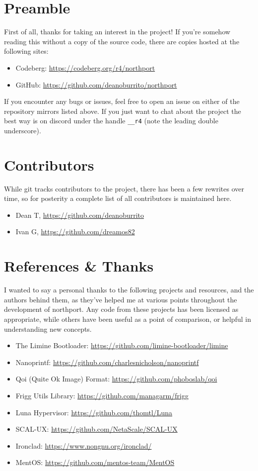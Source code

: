 \section{Preamble}
First of all, thanks for taking an interest in the project! If you're somehow reading this without a copy of the source code, there are copies hosted at the following sites:

\begin{itemize}
    \item Codeberg: \url{https://codeberg.org/r4/northport}
    \item GitHub: \url{https://github.com/deanoburrito/northport}
\end{itemize}

If you encounter any bugs or issues, feel free to open an issue on either of the repository mirrors listed above. If you just want to chat about the project the best way is on discord under the handle \verb|__r4| (note the leading double underscore).

\section{Contributors}
While git tracks contributors to the project, there has been a few rewrites over time, so for posterity a complete list of all contributors is maintained here. 

\begin{itemize}
    \item Dean T, \url{https://github.com/deanoburrito}
    \item Ivan G, \url{https://github.com/dreamos82}
\end{itemize}

\section{References \& Thanks}
I wanted to say a personal thanks to the following projects and resources, and the authors behind them, as they've helped me at various points throughout the development of northport. Any code from these projects has been licensed as appropriate, while others have been useful as a point of comparison, or helpful in understanding new concepts.

\begin{itemize}
    \item The Limine Bootloader: \url{https://github.com/limine-bootloader/limine}
    \item Nanoprintf: \url{https://github.com/charlesnicholson/nanoprintf}
    \item Qoi (Quite Ok Image) Format: \url{https://github.com/phoboslab/qoi}
    \item Frigg Utils Library: \url{https://github.com/managarm/frigg}
    \item Luna Hypervisor: \url{https://github.com/thomtl/Luna}
    \item SCAL-UX: \url{https://github.com/NetaScale/SCAL-UX}
    \item Ironclad: \url{https://www.nongnu.org/ironclad/}
    \item MentOS: \url{https://github.com/mentos-team/MentOS}
\end{itemize}

